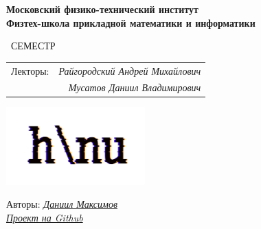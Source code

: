 \begin{titlepage}
	\clearpage\thispagestyle{empty}
	\centering
	
	\textbf{Московский физико-технический институт \\ Физтех-школа прикладной математики и информатики}
	\vspace{33ex}
	
	{\textbf{\FullCourseNameFirstPart}}
	
	\SemesterNumber\ СЕМЕСТР  
	\vspace{1ex}
	\begin{center}
		\begin{tabular}{rr}
			Лекторы:\!\!\!\!& \textit{Райгородский Андрей Михайлович} \\
			& \textit{Мусатов Даниил Владимирович}
		\end{tabular}
	\end{center}
	
	\includegraphics[width=0.4\textwidth]{images/logo_ltc.png}

	\begin{flushright}
		\noindent
		Авторы: \href{https://vk.com/wolfawi}{\textit{Даниил Максимов}}
		\\
		\href{\GithubLink}{\textit{Проект на Github}}
	\end{flushright}
	
	\vfill
	\CourseDate
	\pagebreak
\end{titlepage}
